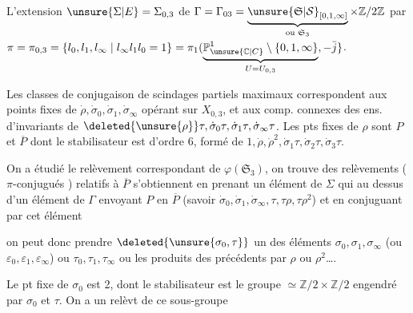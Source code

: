 
L'extension $\unsure{\Sigma|E}=\Sigma_{0,3}$ de $\Gamma=\Gamma_{03}=\underbrace{\unsure{\mathfrak S|\mathcal S}_{[0,1,\infty]}}_{\text{ou }\mathfrak S_3}\times\mathbb Z/2\mathbb Z$  par $\pi=\pi_{0,3}=\{l_0,l_1,l_\infty\mid l_\infty l_1l_0=1\}=\pi_1(\underbrace{\mathbb P^1_{\unsure{\mathbb C|C}}\setminus\{0,1,\infty\}}_{U=U_{0,3}},-\bar j\}$.

Les classes de conjugaison de scindages partiels maximaux  correspondent aux points fixes de $\dot\rho,\dot\sigma_0,\dot\sigma_1,\dot\sigma_\infty$ opérant sur $X_{0,3}$, et  aux comp. connexes des ens. d'invariants de $\deleted{\unsure{\rho}}\tau,\dot\sigma_0\tau,\dot\sigma_1\tau,\dot\sigma_\infty\tau$. Les pts fixes de $\rho$ sont $P$ et $\overline P$ dont le stabilisateur est d'ordre 6,  formé de $1,\dot\rho,\dot\rho^2,\dot\sigma_1\tau,\dot\sigma_2\tau,\dot\sigma_3\tau$.

On a étudié le relèvement correspondant  de $\varphi(\mathfrak S_3)$, on trouve des relèvements ($\pi$-conjugués ) relatifs à $\overline P$ s'obtiennent en  prenant un élément de $\Sigma$  qui  au dessus d'un élément de $\Gamma$ envoyant $P$ en $\overline P$ (savoir $\dot\sigma_0,\dot\sigma_1,\dot\sigma_\infty,\tau,\tau\rho,\tau\rho^2$) et en conjuguant par cet élément

on peut donc prendre $\deleted{\unsure{\sigma_0,\tau}}$ un des éléments $\sigma_0,\sigma_1,\sigma_\infty$ (ou $\varepsilon_0,\varepsilon_1,\varepsilon_\infty$) ou $\tau_0,\tau_1,\tau_\infty$ ou  les produits des précédents par  $\rho$ ou $\rho^2$\ldots.

 Le  pt fixe de $\sigma_0$ est 2, dont le stabilisateur est le groupe $\simeq\mathbb Z/2\times\mathbb Z/2$ engendré par $\sigma_0$ et $\tau$. On a un relèvt de ce sous-groupe
